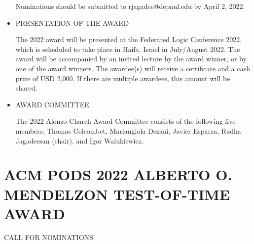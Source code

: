 \documentclass[prodmode,acmtecs]{acmsmall} %
\begin{document}
\begin{itemize}
  Nominations should be submitted to rjagadee@depaul.edu by April 2, 2022. 
 
\item  PRESENTATION OF THE AWARD 
 
  The 2022 award will be presented at the Federated Logic Conference 2022, which is scheduled to take place in Haifa, Israel in July/August 2022. The award will be accompanied by an invited lecture by the award winner, or by one of the award winners. The awardee(s) will receive a certificate and a cash prize of USD 2,000. If there are multiple awardees, this amount will be shared. 
 
\item  AWARD COMMITTEE 
 
  The 2022 Alonzo Church Award Committee consists of the following five members: Thomas Colcombet, Mariangiola Dezani, Javier Esparza, Radha Jagadeesan (chair), and Igor Walukiewicz. 
 
\end{itemize}\section{ACM PODS 2022 ALBERTO O. MENDELZON TEST-OF-TIME AWARD}\label{ACMPODS2022ALBERTOOMENDELZONTESTOFTIMEAWARD}CALL FOR NOMINATIONS 
\end{document}
